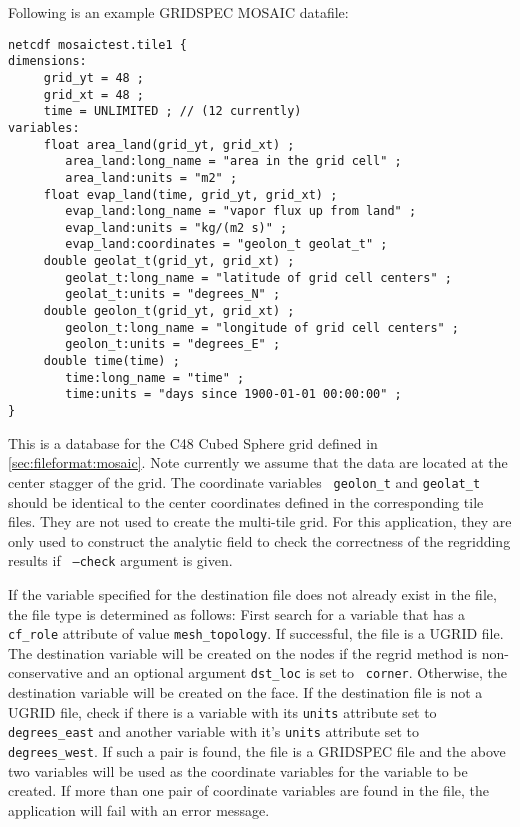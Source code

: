Following is an example GRIDSPEC MOSAIC datafile:

\begin{verbatim}
netcdf mosaictest.tile1 {
dimensions:
     grid_yt = 48 ;
     grid_xt = 48 ;
     time = UNLIMITED ; // (12 currently)
variables:
     float area_land(grid_yt, grid_xt) ;
        area_land:long_name = "area in the grid cell" ;
        area_land:units = "m2" ;
     float evap_land(time, grid_yt, grid_xt) ;
        evap_land:long_name = "vapor flux up from land" ;
        evap_land:units = "kg/(m2 s)" ;
        evap_land:coordinates = "geolon_t geolat_t" ;
     double geolat_t(grid_yt, grid_xt) ;
        geolat_t:long_name = "latitude of grid cell centers" ;
        geolat_t:units = "degrees_N" ;
     double geolon_t(grid_yt, grid_xt) ;
        geolon_t:long_name = "longitude of grid cell centers" ;
        geolon_t:units = "degrees_E" ;
     double time(time) ;
        time:long_name = "time" ;
        time:units = "days since 1900-01-01 00:00:00" ;
}
\end{verbatim}

This is a database for the C48 Cubed Sphere grid defined in
\ref{sec:fileformat:mosaic}.  Note currently we assume that the data are
located at the center stagger of the grid.  The coordinate variables {\tt
  geolon\_t} and {\tt geolat\_t} should be identical to the center coordinates
defined in the corresponding tile files. They are not used to create the
multi-tile grid.  For this application, they are only used to construct the
analytic field to check the correctness of the regridding results if {\tt
  --check} argument is given. 

If the variable specified for the destination file does not already exist in the file, the file type is determined as follows:  
First search for a variable that has a {\tt cf\_role} attribute of value {\tt mesh\_topology}.  If successful,
the file is a UGRID file.  The destination variable will be created on the nodes if the regrid method is 
non-conservative and an optional argument {\tt dst\_loc} is set to {\tt
  corner}.  Otherwise, the destination variable will be created
on the face.  If the destination file is not a UGRID file, check if there is a variable with its {\tt units} attribute set to {\tt degrees\_east} and another variable with it's {\tt units} attribute set to {\tt degrees\_west}.  If such a pair is found, 
the file is a GRIDSPEC file and the above two variables will be used as the coordinate variables for the 
variable to be created.  If more than one pair of coordinate variables are found in the file, the application 
will fail with an error message.  

